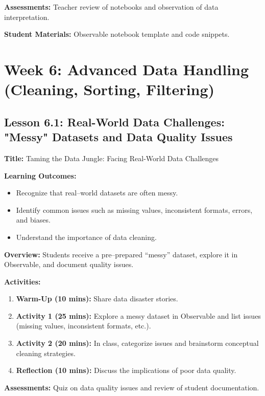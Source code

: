 \documentclass{tufte-book}
\begin{document}
\medskip
\textbf{Assessments:}  
Teacher review of notebooks and observation of data interpretation.

\medskip
\textbf{Student Materials:}  
Observable notebook template and code snippets.

\section{Week 6: Advanced Data Handling (Cleaning, Sorting, Filtering)}

\subsection{Lesson 6.1: Real-World Data Challenges: "Messy" Datasets and Data Quality Issues}
\textbf{Title:} Taming the Data Jungle: Facing Real-World Data Challenges

\medskip
\textbf{Learning Outcomes:}
\begin{itemize}[leftmargin=*, label={\textbullet}]
    \item Recognize that real--world datasets are often messy.
    \item Identify common issues such as missing values, inconsistent formats, errors, and biases.
    \item Understand the importance of data cleaning.
\end{itemize}

\medskip
\textbf{Overview:}  
Students receive a pre--prepared “messy” dataset, explore it in Observable, and document quality issues.

\medskip
\textbf{Activities:}
\begin{enumerate}[label=\arabic*.]
    \item \textbf{Warm-Up (10 mins):} Share data disaster stories.
    \item \textbf{Activity 1 (25 mins):} Explore a messy dataset in Observable and list issues (missing values, inconsistent formats, etc.).
    \item \textbf{Activity 2 (20 mins):} In class, categorize issues and brainstorm conceptual cleaning strategies.
    \item \textbf{Reflection (10 mins):} Discuss the implications of poor data quality.
\end{enumerate}

\medskip
\textbf{Assessments:}  
Quiz on data quality issues and review of student documentation.
\end{document}
